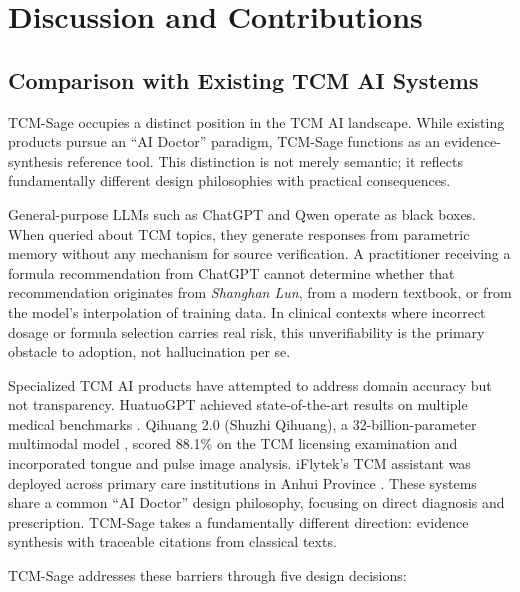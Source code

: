 \chapter{Discussion and Contributions}

\section{Comparison with Existing TCM AI Systems}

TCM-Sage occupies a distinct position in the TCM AI landscape. While existing products pursue an ``AI Doctor'' paradigm, TCM-Sage functions as an evidence-synthesis reference tool. This distinction is not merely semantic; it reflects fundamentally different design philosophies with practical consequences.

General-purpose LLMs such as ChatGPT and Qwen operate as black boxes. When queried about TCM topics, they generate responses from parametric memory without any mechanism for source verification. A practitioner receiving a formula recommendation from ChatGPT cannot determine whether that recommendation originates from \textit{Shanghan Lun}, from a modern textbook, or from the model's interpolation of training data. In clinical contexts where incorrect dosage or formula selection carries real risk, this unverifiability is the primary obstacle to adoption, not hallucination per se.

Specialized TCM AI products have attempted to address domain accuracy but not transparency. HuatuoGPT achieved state-of-the-art results on multiple medical benchmarks \cite{huatuogpt2023}. Qihuang 2.0 (Shuzhi Qihuang), a 32-billion-parameter multimodal model \cite{qihuang2024ecnu}, scored 88.1\% on the TCM licensing examination and incorporated tongue and pulse image analysis. iFlytek's TCM assistant was deployed across primary care institutions in Anhui Province \cite{iflytek2024cnr}. These systems share a common ``AI Doctor'' design philosophy, focusing on direct diagnosis and prescription. TCM-Sage takes a fundamentally different direction: evidence synthesis with traceable citations from classical texts.

TCM-Sage addresses these barriers through five design decisions:

